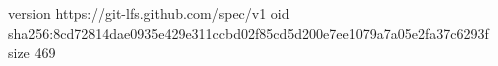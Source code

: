 version https://git-lfs.github.com/spec/v1
oid sha256:8cd72814dae0935e429e311ccbd02f85cd5d200e7ee1079a7a05e2fa37c6293f
size 469
